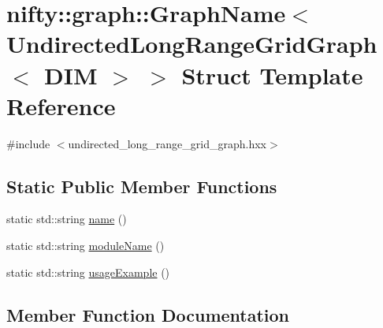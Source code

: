 \hypertarget{structnifty_1_1graph_1_1GraphName_3_01UndirectedLongRangeGridGraph_3_01DIM_01_4_01_4}{}\section{nifty\+:\+:graph\+:\+:Graph\+Name$<$ Undirected\+Long\+Range\+Grid\+Graph$<$ D\+IM $>$ $>$ Struct Template Reference}
\label{structnifty_1_1graph_1_1GraphName_3_01UndirectedLongRangeGridGraph_3_01DIM_01_4_01_4}


{\ttfamily \#include $<$undirected\+\_\+long\+\_\+range\+\_\+grid\+\_\+graph.\+hxx$>$}

\subsection*{Static Public Member Functions}
\begin{DoxyCompactItemize}
\item 
static std\+::string \hyperlink{structnifty_1_1graph_1_1GraphName_3_01UndirectedLongRangeGridGraph_3_01DIM_01_4_01_4_a87ba704f4de29d90396e25befc25d373}{name} ()
\item 
static std\+::string \hyperlink{structnifty_1_1graph_1_1GraphName_3_01UndirectedLongRangeGridGraph_3_01DIM_01_4_01_4_a687e9e685f12d66a40a706be362d7d6b}{module\+Name} ()
\item 
static std\+::string \hyperlink{structnifty_1_1graph_1_1GraphName_3_01UndirectedLongRangeGridGraph_3_01DIM_01_4_01_4_a75bc7581a10a629723d04227959a8ed3}{usage\+Example} ()
\end{DoxyCompactItemize}


\subsection{Member Function Documentation}
\mbox{\label{structnifty_1_1graph_1_1GraphName_3_01UndirectedLongRangeGridGraph_3_01DIM_01_4_01_4_a687e9e685f12d66a40a706be362d7d6b}} 
